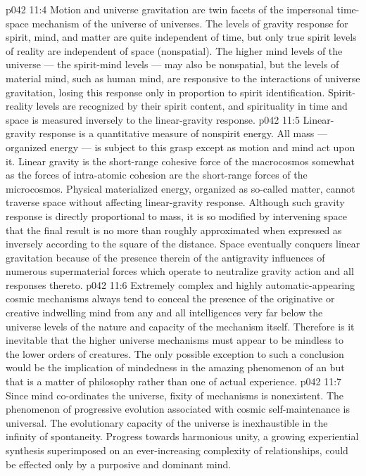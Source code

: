 \vs p042 11:4 \pc Motion and universe gravitation are twin facets of the impersonal time\hyp{}space mechanism of the universe of universes. The levels of gravity response for spirit, mind, and matter are quite independent of time, but only true spirit levels of reality are independent of space (nonspatial). The higher mind levels of the universe --- the spirit\hyp{}mind levels --- may also be nonspatial, but the levels of material mind, such as human mind, are responsive to the interactions of universe gravitation, losing this response only in proportion to spirit identification. Spirit\hyp{}reality levels are recognized by their spirit content, and spirituality in time and space is measured inversely to the linear\hyp{}gravity response.
\vs p042 11:5 Linear\hyp{}gravity response is a quantitative measure of nonspirit energy. All mass --- organized energy --- is subject to this grasp except as motion and mind act upon it. Linear gravity is the short\hyp{}range cohesive force of the macrocosmos somewhat as the forces of intra\hyp{}atomic cohesion are the short\hyp{}range forces of the microcosmos. Physical materialized energy, organized as so\hyp{}called matter, cannot traverse space without affecting linear\hyp{}gravity response. Although such gravity response is directly proportional to mass, it is so modified by intervening space that the final result is no more than roughly approximated when expressed as inversely according to the square of the distance. Space eventually conquers linear gravitation because of the presence therein of the antigravity influences of numerous supermaterial forces which operate to neutralize gravity action and all responses thereto.
\vs p042 11:6 \pc Extremely complex and highly automatic\hyp{}appearing cosmic mechanisms always tend to conceal the presence of the originative or creative indwelling mind from any and all intelligences very far below the universe levels of the nature and capacity of the mechanism itself. Therefore is it inevitable that the higher universe mechanisms must appear to be mindless to the lower orders of creatures. The only possible exception to such a conclusion would be the implication of mindedness in the amazing phenomenon of an  but that is a matter of philosophy rather than one of actual experience.
\vs p042 11:7 Since mind co\hyp{}ordinates the universe, fixity of mechanisms is nonexistent. The phenomenon of progressive evolution associated with cosmic self\hyp{}maintenance is universal. The evolutionary capacity of the universe is inexhaustible in the infinity of spontaneity. Progress towards harmonious unity, a growing experiential synthesis superimposed on an ever\hyp{}increasing complexity of relationships, could be effected only by a purposive and dominant mind.
